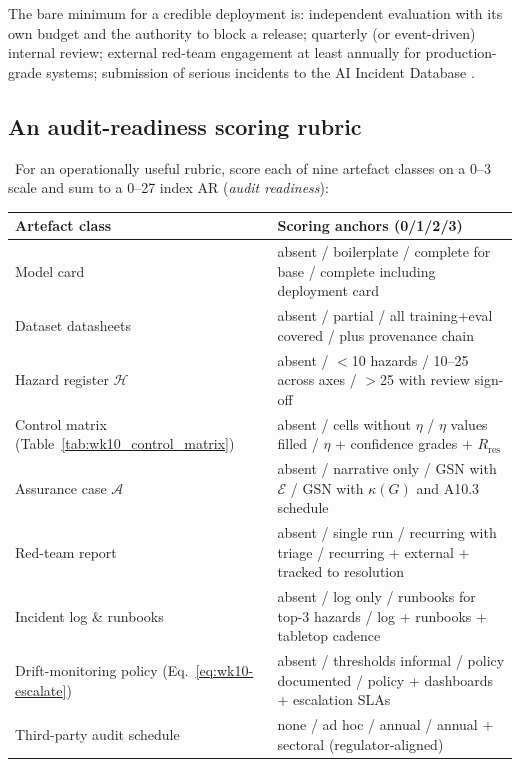 The bare minimum for a credible deployment is: independent
evaluation with its own budget and the authority to block a
release; quarterly (or event-driven) internal review; external
red-team engagement at least annually for production-grade
systems; submission of serious incidents to the AI Incident
Database \citep{aiid}.

\subsection{An audit-readiness scoring rubric}
\label{sec:wk10_audit_rubric}

\Def\ For an operationally useful rubric, score each of nine
artefact classes on a 0--3 scale and sum to a 0--27 index
$\mathrm{AR}$ (\emph{audit readiness}):

\begin{center}
\small
\begin{tabular}{p{4.3cm} p{9.5cm}}
\toprule
\textbf{Artefact class} & \textbf{Scoring anchors (0/1/2/3)} \\
\midrule
Model card
  & absent / boilerplate / complete for base
    / complete including deployment card \\
Dataset datasheets
  & absent / partial / all training+eval covered
    / plus provenance chain \\
Hazard register $\mathcal{H}$
  & absent / $<$10 hazards / 10--25 across axes
    / $>$25 with review sign-off \\
Control matrix (Table~\ref{tab:wk10_control_matrix})
  & absent / cells without $\eta$
    / $\eta$ values filled
    / $\eta$ + confidence grades + $R_\mathrm{res}$ \\
Assurance case $\mathcal{A}$
  & absent / narrative only / GSN with $\mathcal{E}$
    / GSN with $\kappa(G)$ and A10.3 schedule \\
Red-team report
  & absent / single run / recurring with triage
    / recurring + external + tracked to resolution \\
Incident log \& runbooks
  & absent / log only / runbooks for top-3 hazards
    / log + runbooks + tabletop cadence \\
Drift-monitoring policy (Eq.~\eqref{eq:wk10-escalate})
  & absent / thresholds informal / policy documented
    / policy + dashboards + escalation SLAs \\
Third-party audit schedule
  & none / ad hoc / annual / annual + sectoral
    (regulator-aligned) \\
\bottomrule
\end{tabular}
\end{center}

